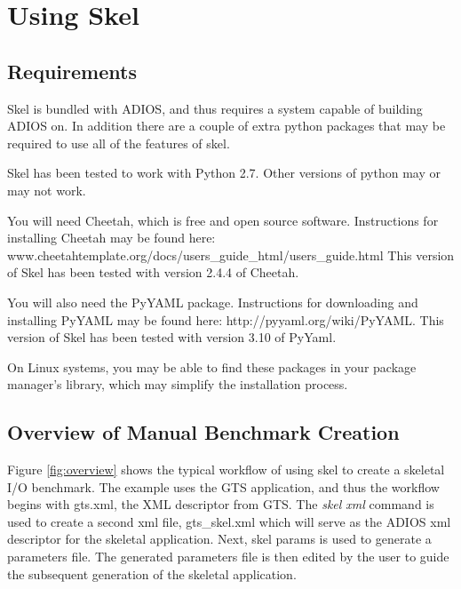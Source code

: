 \chapter{Using Skel}

\section{Requirements}
Skel is bundled with ADIOS, and thus requires a system capable of building ADIOS on. In addition there are a couple of extra python packages that may be required to use all of the features of skel. 

Skel has been tested to work with Python 2.7. Other versions of python may or may not work.

You will need Cheetah, which is free and open source software. Instructions for installing
Cheetah may be found here: www.cheetahtemplate.org/docs/users\_guide\_html/users\_guide.html
This version of Skel has been tested with version 2.4.4 of Cheetah.

You will also need the PyYAML package. Instructions for downloading and installing 
PyYAML may be found here: http://pyyaml.org/wiki/PyYAML. This version of Skel has been
tested with version 3.10 of PyYaml.

On Linux systems, you may be able to find these packages in your package manager's library,
which may simplify the installation process. 


\section{Overview of Manual Benchmark Creation}
Figure \ref{fig:overview}  shows the typical workflow of using skel to create a skeletal I/O 
benchmark. The example uses the GTS application, and thus the workflow begins
with gts.xml, the XML descriptor from GTS. The {\it skel xml} command is used
to create a second xml file, gts\_skel.xml which will serve as the ADIOS xml
descriptor for the skeletal application. Next, skel params is used to generate
a parameters file. The generated parameters file is then edited by the user to
guide the subsequent generation of the skeletal application.

